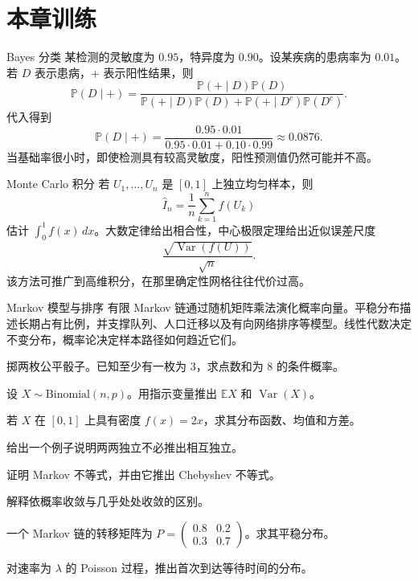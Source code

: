 \section{本章训练}

\begin{workedexample}{Bayes 分类}
某检测的灵敏度为 $0.95$，特异度为 $0.90$。设某疾病的患病率为 $0.01$。若 $D$ 表示患病，$+$ 表示阳性结果，则
\[
\mathbb{P}(D\mid +)
=\frac{\mathbb{P}(+\mid D)\mathbb{P}(D)}
{\mathbb{P}(+\mid D)\mathbb{P}(D)+\mathbb{P}(+\mid D^c)\mathbb{P}(D^c)}.
\]
代入得到
\[
\mathbb{P}(D\mid +)=\frac{0.95\cdot0.01}{0.95\cdot0.01+0.10\cdot0.99}\approx0.0876.
\]
当基础率很小时，即使检测具有较高灵敏度，阳性预测值仍然可能并不高。
\end{workedexample}

\begin{applicationbox}{Monte Carlo 积分}
若 $U_1,\dots,U_n$ 是 $[0,1]$ 上独立均匀样本，则
\[
    \widehat I_n=\frac1n\sum_{k=1}^n f(U_k)
\]
估计 $\int_0^1f(x)\,dx$。大数定律给出相合性，中心极限定理给出近似误差尺度
\[
    \frac{\sqrt{\operatorname{Var}(f(U))}}{\sqrt n}.
\]
该方法可推广到高维积分，在那里确定性网格往往代价过高。
\end{applicationbox}

\begin{applicationbox}{Markov 模型与排序}
有限 Markov 链通过随机矩阵乘法演化概率向量。平稳分布描述长期占有比例，并支撑队列、人口迁移以及有向网络排序等模型。线性代数决定不变分布，概率论决定样本路径如何趋近它们。
\end{applicationbox}

\begin{chapterexercises}
    \item 掷两枚公平骰子。已知至少有一枚为 $3$，求点数和为 $8$ 的条件概率。
    \item 设 $X\sim\mathrm{Binomial}(n,p)$。用指示变量推出 $\mathbb{E}X$ 和 $\operatorname{Var}(X)$。
    \item 若 $X$ 在 $[0,1]$ 上具有密度 $f(x)=2x$，求其分布函数、均值和方差。
    \item 给出一个例子说明两两独立不必推出相互独立。
    \item 证明 Markov 不等式，并由它推出 Chebyshev 不等式。
    \item 解释依概率收敛与几乎处处收敛的区别。
    \item 一个 Markov 链的转移矩阵为 $P=\begin{pmatrix}0.8&0.2\\0.3&0.7\end{pmatrix}$。求其平稳分布。
    \item 对速率为 $\lambda$ 的 Poisson 过程，推出首次到达等待时间的分布。
\end{chapterexercises}

